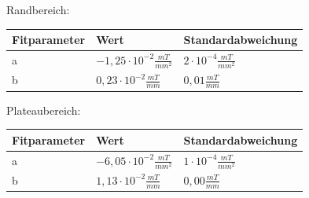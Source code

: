 \documentclass[bigchapter,colorback,accentcolor=tud4b,linedtoc,11pt]{tudreport}
\begin{document}
Randbereich:
\begin{center}
  \begin{tabular}{|p{2.6cm}|p{5cm}|p{5cm}|}
    \hline
    Fitparameter & Wert                                   & Standardabweichung  \\ \hline
    a            & $-1,25 \cdot 10^{-2} \frac{mT}{mm^2}$ & $2 \cdot 10^{-4} \frac{mT}{mm^2}$   \\ \hline
    b            & $0,23 \cdot 10^{-2} \frac{mT}{mm}$    & $0,01 \frac{mT}{mm}$ \\ \hline
	\end{tabular}
\end{center}


Plateaubereich:
\begin{center}
  \begin{tabular}{|p{2.6cm}|p{5cm}|p{5cm}|}
    \hline
    Fitparameter & Wert                                   & Standardabweichung  \\ \hline
    a            & $-6,05 \cdot 10^{-2} \frac{mT}{mm^2}$ & $1 \cdot 10^{-4} \frac{mT}{mm^2}$   \\ \hline
    b            & $1,13 \cdot 10^{-2} \frac{mT}{mm}$    & $0,00 \frac{mT}{mm}$ \\ \hline
	\end{tabular}
\end{center}
\end{document}
